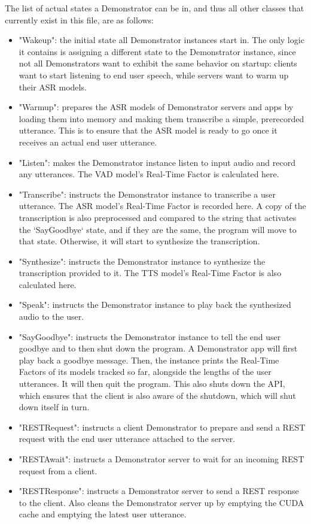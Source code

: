 The list of actual states a Demonstrator can be in, and thus all other classes that currently exist in this file, are as follows:
\begin{itemize}
    \item "Wakeup": the initial state all Demonstrator instances start in.
    The only logic it contains is assigning a different state to the Demonstrator instance, since not all Demonstrators want to exhibit the same behavior on startup: clients want to start listening to end user speech, while servers want to warm up their ASR models.
    \item "Warmup": prepares the ASR models of Demonstrator servers and apps by loading them into memory and making them transcribe a simple, prerecorded utterance.
    This is to ensure that the ASR model is ready to go once it receives an actual end user utterance.
    \item "Listen": makes the Demonstrator instance listen to input audio and record any utterances.
    The VAD model's Real-Time Factor is calculated here.
    \item "Transcribe": instructs the Demonstrator instance to transcribe a user utterance.
    The ASR model's Real-Time Factor is recorded here.
    A copy of the transcription is also preprocessed and compared to the string that activates the `SayGoodbye` state, and if they are the same, the program will move to that state.
    Otherwise, it will start to synthesize the transcription.
    \item "Synthesize": instructs the Demonstrator instance to synthesize the transcription provided to it.
    The TTS model's Real-Time Factor is also calculated here.
    \item "Speak": instructs the Demonstrator instance to play back the synthesized audio to the user.
    \item "SayGoodbye": instructs the Demonstrator instance to tell the end user goodbye and to then shut down the program.
    A Demonstrator app will first play back a goodbye message.
    Then, the instance prints the Real-Time Factors of its models tracked so far, alongside the lengths of the user utterances.
    It will then quit the program.
    This also shuts down the API, which ensures that the client is also aware of the shutdown, which will shut down itself in turn.
    \item "RESTRequest": instructs a client Demonstrator to prepare and send a REST request with the end user utterance attached to the server.
    \item "RESTAwait": instructs a Demonstrator server to wait for an incoming REST request from a client.
    \item "RESTResponse": instructs a Demonstrator server to send a REST response to the client.
    Also cleans the Demonstrator server up by emptying the CUDA cache and emptying the latest user utterance.
\end{itemize}

